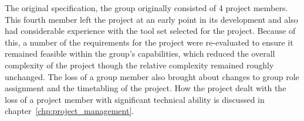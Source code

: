     The original specification, the group originally consisted of 4 project members. This fourth member left the project at an early point in its development and also had considerable experience with the tool set selected for the project. Because of this, a number of the requirements for the project were re-evaluated to ensure it remained feasible within the group's capabilities, which reduced the overall complexity of the project though the relative complexity remained roughly unchanged. The loss of a group member also brought about changes to group role assignment and the timetabling of the project. How the project dealt with the loss of a project member with significant technical ability is discussed in chapter~\ref{chp:project_management}. 